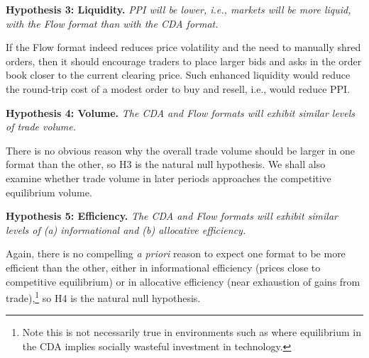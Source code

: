 \documentclass[12pt]{article}
\begin{document}
\vspace{0.3cm}
\noindent \textbf{Hypothesis 3: Liquidity.} \textit{ PPI will be lower, i.e., markets will be more liquid, with the Flow format than with the CDA format.}

\noindent 
If the Flow format indeed reduces price volatility and the need to manually shred orders, then it should encourage traders to place larger bids and asks in the order book closer to the current clearing price. Such enhanced liquidity would reduce the round-trip cost of a modest order to buy and resell, i.e., would reduce PPI. 

\vspace{0.3cm}
\noindent \textbf{Hypothesis 4: Volume.} \textit{The CDA and Flow formats will exhibit similar levels of trade volume. }

\noindent There is no obvious reason why the overall trade volume should be larger in one format than the other, so H3 is the natural null hypothesis. We shall also examine whether trade volume in later periods approaches the competitive equilibrium volume. 

\vspace{0.3cm}
\noindent \textbf{Hypothesis 5: Efficiency.} \textit{The CDA and Flow formats will exhibit similar levels of (a) informational and (b) allocative efficiency.} 

\noindent Again, there is no compelling \textit{a priori} reason to expect one format to be more efficient than the other, either in informational efficiency (prices close to competitive equilibrium) or in allocative efficiency (near exhaustion of gains from trade),\footnote{Note this is not necessarily true in environments such as \cite{Budish2015, Aldrich2019} where equilibrium in the CDA implies socially wasteful investment in technology.}
so H4 is the natural null hypothesis.
\end{document}
